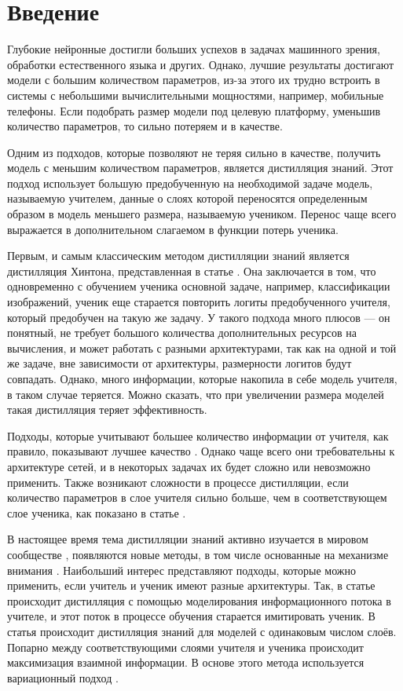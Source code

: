 \section{Введение}

Глубокие нейронные достигли больших успехов в задачах машинного зрения, обработки естественного языка и других.
Однако, лучшие результаты достигают модели с большим количеством параметров,
из-за этого их трудно встроить в системы с небольшими вычислительными мощностями, например, мобильные телефоны.
Если подобрать размер модели под целевую платформу, уменьшив количество параметров, то сильно потеряем и в качестве.

Одним из подходов, которые позволяют не теряя сильно в качестве, получить модель с меньшим количеством параметров, является дистилляция знаний.
Этот подход использует большую предобученную на необходимой задаче модель, называемую учителем,
данные о слоях которой переносятся определенным образом в модель меньшего размера, называемую учеником.
Перенос чаще всего выражается в дополнительном слагаемом в функции потерь ученика.

Первым, и самым классическим методом дистилляции знаний является дистилляция Хинтона, представленная в статье \cite{hinton2015distilling}.
Она заключается в том, что одновременно с обучением ученика основной задаче, например, классификации изображений,
ученик еще старается повторить логиты предобученного учителя, который предобучен на такую же задачу.
У такого подхода много плюсов --- он понятный, не требует большого количества дополнительных ресурсов на вычисления,
и может работать с разными архитектурами, так как на одной и той же задаче, вне зависимости от архитектуры, размерности логитов будут совпадать.
Однако, много информации, которые накопила в себе модель учителя, в таком случае теряется. Можно сказать, что при увеличении размера моделей такая
дистилляция теряет эффективность.

Подходы, которые учитывают большее количество информации от учителя, как правило, показывают лучшее качество \cite{Gou_2021}.
Однако чаще всего они требовательны к архитектуре сетей, и в некоторых задачах их будет сложно или невозможно применить.
Также возникают сложности в процессе дистилляции, если количество параметров в слое учителя сильно больше, чем в соответствующем слое ученика,
как показано в статье \cite{mirzadeh2020improved}.

В настоящее время тема дистилляции знаний активно изучается в мировом сообществе \cite{Gou_2021},
появляются новые методы, в том числе основанные на механизме внимания \cite{passban2020alpkd}.
Наибольший интерес представляют подходы, которые можно применить, если учитель и ученик имеют разные архитектуры.
Так, в статье \cite{passalis2020heterogeneous} происходит дистилляция с помощью моделирования информационного потока в учителе,
и этот поток в процессе обучения старается имитировать ученик.
В статья \cite{Ahn_2019_CVPR} происходит дистилляция знаний для моделей с одинаковым числом слоёв.
Попарно между соответствующими слоями учителя и ученика происходит максимизация взаимной информации.
В основе этого метода используется вариационный подход \cite{barber2004algorithm}.

